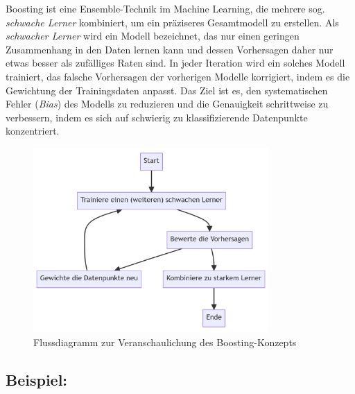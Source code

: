 Boosting ist eine Ensemble-Technik im Machine Learning, die mehrere sog. \emph{\glqq schwache Lerner\grqq} kombiniert,
um ein präziseres Gesamtmodell zu erstellen. Als \emph{schwacher Lerner} wird ein Modell bezeichnet, das nur einen geringen
Zusammenhang in den Daten lernen kann und dessen Vorhersagen daher nur etwas besser als zufälliges Raten sind.
In jeder Iteration wird ein solches Modell trainiert, das falsche
Vorhersagen der vorherigen Modelle korrigiert, indem es die Gewichtung der Trainingsdaten anpasst.
Das Ziel ist es, den systematischen Fehler (\emph{Bias}) des Modells zu reduzieren und die Genauigkeit
schrittweise zu verbessern, indem es sich auf schwierig zu klassifizierende Datenpunkte konzentriert.

\begin{figure}[h]
    \centering
    \includegraphics[width=0.8\textwidth]{"./figures/Boosting_Graph"}
    \caption{Flussdiagramm zur Veranschaulichung des Boosting-Konzepts}
\end{figure}

\subsection*{Beispiel:}
